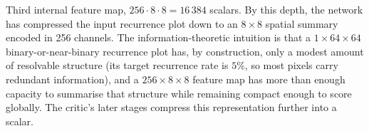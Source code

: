 
Third internal feature map, $256 \cdot 8 \cdot 8 = 16\,384$ scalars. By
this depth, the network has compressed the input recurrence plot down
to an $8 \times 8$ spatial summary encoded in 256 channels. The
information-theoretic intuition is that a $1 \times 64 \times 64$
binary-or-near-binary recurrence plot has, by construction, only a
modest amount of resolvable structure (its target recurrence rate is
$5\%$, so most pixels carry redundant information), and a $256 \times
8 \times 8$ feature map has more than enough capacity to summarise that
structure while remaining compact enough to score globally. The
critic's later stages compress this representation further into a
scalar.
